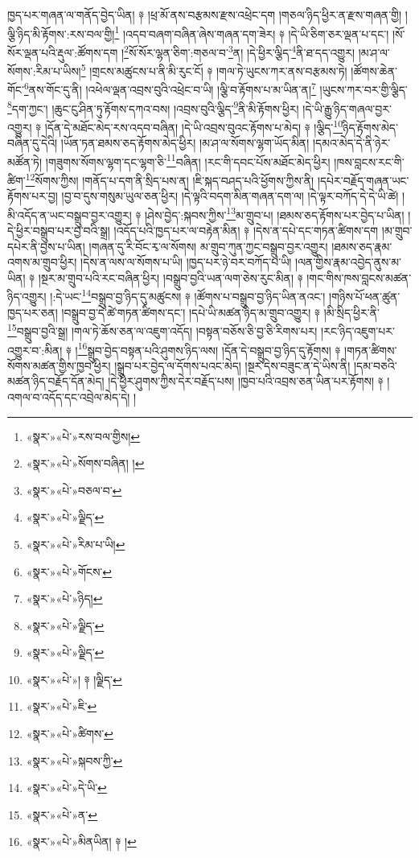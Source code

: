 ཁྱད་པར་གཞན་ལ་གནོད་བྱེད་ཡིན། ༈ །ཕྲ་མོ་ནས་བརྩམས་རྫས་འཕྲེང་དག །གཅལ་ཉིད་ཕྱིར་ན་རྫས་གཞན་གྱི། །ལྕི་ཉིད་མི་རྟོགས་:རས་བལ་གྱི།\footnote{«སྣར་»«པེ་»རས་བལ་གྱིས།} །འདབ་བཞག་བཞིན་ཞེས་གཞན་དག་ཟེར། ༈ །དེ་ཡི་ཅིག་ཅར་ལྡན་པ་དང་། །སོ་སོར་ལྡན་པའི་རྡུལ་:ཚོགས་དག །\footnote{«སྣར་»«པེ་»སོགས་བཞིན། །}སོ་སོར་ལྷན་ཅིག་:གཅལ་བ་\footnote{«སྣར་»«པེ་»བཅལ་བ་}ན། །དེ་ཕྱིར་ལྕིད་\footnote{«སྣར་»«པེ་»ལྗིད་}ནི་ཐ་དད་འགྱུར། །མ་ཤ་ལ་སོགས་:རིམ་པ་ཡིས།\footnote{«སྣར་»«པེ་»རིམ་པ་ཡི།} །གྲངས་མཚུངས་པ་ནི་མི་རུང་ངོ། ༈ །གལ་ཏེ་ཡུངས་ཀར་ནས་བརྩམས་ཏེ། །ཚོགས་ཆེན་གོང་\footnote{«སྣར་»«པེ་»གོངས་}ནས་གོང་དུ་ནི། །འཕེལ་ལྡན་འབྲས་བུའི་འཕྲེང་བ་ཡི། །ལྕི་བ་རྟོགས་པ་མ་ཡིན་ན།\footnote{«སྣར་»«པེ་»ཉིད།} །ཡུངས་ཀར་བར་གྱི་ལྕིད་\footnote{«སྣར་»«པེ་»ལྗིད་}དག་ཀྱང་། །ཆུང་ངུ་ཤིན་ཏུ་རྟོགས་དཀའ་བས། །འབྲས་བུའི་ལྕིད་\footnote{«སྣར་»«པེ་»ལྗིད་}ནི་མི་རྟོགས་ཕྱིར། །དེ་ཡི་རྒྱུ་ཉིད་གཞལ་བྱར་འགྱུར། ༈ །དོན་དེ་མཐོང་མེད་རས་འདབ་བཞིན། །དེ་ཡི་འབྲས་བུའང་རྟོགས་པ་མེད། ༈ །ལྕིད་\footnote{«སྣར་»«པེ་»། ༈ །ལྗིད་}ཉིད་རྟོགས་མེད་བཞིན་དུ་དེའི། །ཡོན་ཏན་ཐམས་ཅད་རྟོགས་མེད་ཕྱིར། །མ་ཤ་ལ་སོགས་ལྷག་ཡོད་མིན། །དམའ་མེད་དེ་ནི་ཉེར་མཚོན་ཏེ། །གཟུགས་སོགས་ལྷག་དང་ལྷག་ཅི་\footnote{«སྣར་»«པེ་»ཇི་}བཞིན། །རང་གི་དབང་པོས་མཐོང་མེད་ཕྱིར། །ཁས་བླངས་རང་གི་ཚིག་\footnote{«སྣར་»«པེ་»ཚིགས་}སོགས་ཀྱིས། །གནོད་པ་དག་ནི་སྲིད་པས་ན། །ཇི་སྐད་བཤད་པའི་ཕྱོགས་ཀྱིས་ནི། །དཔེར་བརྗོད་གཞན་ཡང་རྟོགས་པར་བྱ། །བྱ་བ་དུས་གསུམ་ཡུལ་ཅན་ཕྱིར། །དེ་ལྟའི་བདག་མིན་གཞན་དག་ལ། །དེ་ལྟར་བཀོད་དེ་དེ་ཡི་ཚེ། །མི་འདོད་ན་ཡང་བསྒྲུབ་བྱར་འགྱུར། ༈ །ཤེས་བྱེད་:སྐབས་ཀྱིས་\footnote{«སྣར་»«པེ་»སྐབས་ཀྱི་}མ་གྲུབ་པ། །ཐམས་ཅད་རྟོགས་པར་བྱེད་པ་ཡིན། །དེ་ཕྱིར་བསྒྲུབ་པར་བྱ་བའི་སྒྲ། །འདོད་པའི་ཁྱད་པར་ལ་བརྟེན་མིན། ༈ །དེས་ན་དཔེ་དང་གཏན་ཚིགས་དག །མ་གྲུབ་དཔེར་ནི་བྱས་པ་ཡིན། །གཞན་དུ་རི་བོང་རྭ་ལ་སོགས། མ་གྲུབ་ཀུན་ཀྱང་བསྒྲུབ་བྱར་འགྱུར། །ཐམས་ཅད་རྣམ་འགས་མ་གྲུབ་ཕྱིར། །དེས་ན་ལས་ལ་སོགས་པ་ཡི། །ཁྱད་པར་ཉེ་བར་བཀོད་པ་ཡི། །ལན་གྱིས་རྣམ་འབྱེད་ནུས་མ་ཡིན། ༈ །སྔར་མ་གྲུབ་པའི་རང་བཞིན་ཕྱིར། །བསྒྲུབ་བྱའི་ཡན་ལག་ཅེས་རུང་མིན། ༈ །གང་གིས་ཁས་བླངས་མཚན་ཉིད་འགྱུར། །:དེ་ཡང་\footnote{«སྣར་»«པེ་»དེ་ཡི་}བསྒྲུབ་བྱ་ཉིད་དུ་མཚུངས། ༈ །ཚོགས་པ་བསྒྲུབ་བྱ་ཉིད་ཡིན་ནའང་། །གཉིས་པོ་ཕན་ཚུན་ཁྱད་པར་ཅན། །བསྒྲུབ་བྱ་དེ་ཚེ་གཏན་ཚིགས་དང་། །དཔེ་ཡི་མཚན་ཉིད་མ་གྲུབ་འགྱུར། ༈ །མི་སྲིད་ཕྱིར་ནི་\footnote{«སྣར་»«པེ་»ན་}བསྒྲུབ་བྱའི་སྒྲ། །གལ་ཏེ་ཆོས་ཅན་ལ་འཇུག་འདོད། །བསྟན་བཅོས་ཅི་བྱ་ཅི་རིགས་པར། །རང་ཉིད་འཇུག་པར་འགྱུར་བ་:མིན། ༈ །\footnote{«སྣར་»«པེ་»མིནཡིན། ༈ །}སྒྲུབ་བྱེད་བསྟན་པའི་ཤུགས་ཉིད་ལས། །དོན་དེ་བསྒྲུབ་བྱ་ཉིད་དུ་རྟོགས། ༈ །གཏན་ཚིགས་སོགས་མཚན་གྱིས་ཁྱབ་ཕྱིར། །སྒྲུབ་པར་བྱེད་ལ་དོགས་པའང་མེད། །སྔར་དེས་བཟུང་ན་དེ་ཡིས་ནི། །དམ་བཅའི་མཚན་ཉིད་བརྗོད་དོན་མེད། །དེ་ཕྱིར་ཤུགས་ཀྱིས་དེར་བརྗོད་པས། །ཁྱབ་པའི་འབྲས་ཅན་ཡིན་པར་རྟོགས། ༈ །འགལ་བ་འདོད་དང་འབྲེལ་མེད་དེ། །
